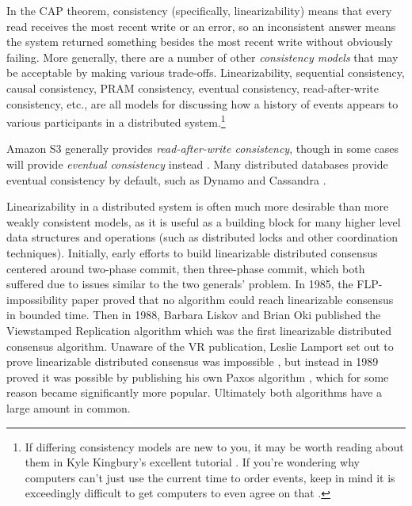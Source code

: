 \documentclass[8pt,fleqn,openany]{book}
\begin{document}
In the CAP theorem, consistency (specifically, linearizability) means that
every read receives the most recent write or an error, so an inconsistent
answer means the system returned something besides the most recent write
without obviously failing.
More generally, there
are a number of other {\em consistency models} that may be acceptable by making
various trade-offs. Linearizability, sequential consistency, causal consistency,
PRAM consistency, eventual consistency, read-after-write consistency, etc., are
all models for discussing how a history of events appears to various
participants in a distributed system.\footnote{If differing consistency models
are new to you, it may be worth reading about them in Kyle Kingbury's excellent
tutorial \cite{aphyr-consistency}. If you're wondering why computers can't just
use the current time to order events, keep in mind it is exceedingly difficult
to get computers to even agree on that \cite{no-now}.}

Amazon S3 generally provides {\em read-after-write consistency}, though in some
cases will provide {\em eventual consistency} instead \cite{s3-consistency}.
Many distributed databases provide eventual consistency by
default, such as Dynamo \cite{dynamo} and Cassandra \cite{cassandra}.

Linearizability in a distributed system is often much more desirable than more
weakly consistent models, as it is
useful as a building block for many higher level data structures and operations
(such as distributed locks and other coordination techniques). Initially, early
efforts to build linearizable distributed consensus centered around two-phase
commit, then three-phase commit, which both
suffered due to issues similar to the two generals' problem. In 1985,
the FLP-impossibility paper \cite{flp} proved that no algorithm
could reach linearizable consensus in bounded time. Then in 1988, Barbara Liskov
and Brian Oki published the Viewstamped Replication algorithm \cite{vr} which
was the first linearizable distributed consensus algorithm. Unaware of the VR
publication, Leslie Lamport set out to prove linearizable distributed consensus
was impossible \cite{paxos-note}, but instead in 1989 proved it was possible by
publishing his own Paxos algorithm \cite{paxos}, which for some reason became
significantly more popular. Ultimately both algorithms have a large amount in
common.
\end{document}
